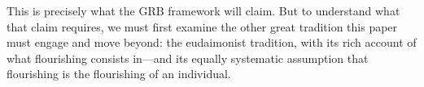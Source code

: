 This is precisely what the GRB framework will claim. But to understand what that claim requires, we must first examine the other great tradition this paper must engage and move beyond: the eudaimonist tradition, with its rich account of what flourishing consists in---and its equally systematic assumption that flourishing is the flourishing of an individual.
